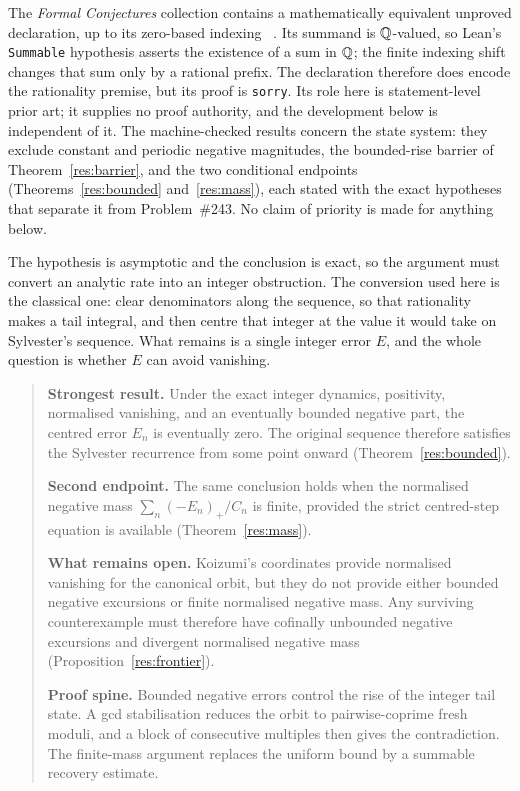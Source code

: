 \documentclass[11pt]{article}
\begin{document}
The \emph{Formal Conjectures} collection contains a mathematically equivalent
unproved declaration, up to its zero-based indexing
~\cite{formalconjectures243}.  Its summand is $\mathbb{Q}$-valued, so Lean's
\texttt{Summable} hypothesis asserts the existence of a sum in $\mathbb{Q}$; the
finite indexing shift changes that sum only by a rational prefix.  The
declaration therefore does encode the rationality premise, but its proof is
\texttt{sorry}.  Its role here is statement-level prior art; it supplies no
proof authority, and the development below is independent of it.
The machine-checked results concern the state system: they exclude constant and
periodic negative magnitudes, the bounded-rise barrier of
Theorem~\ref{res:barrier}, and the two conditional endpoints
(Theorems~\ref{res:bounded} and~\ref{res:mass}), each stated with the exact
hypotheses that separate it from Problem~\#243.  No claim of priority is made
for anything below.

The hypothesis is asymptotic and the conclusion is exact, so the argument must
convert an analytic rate into an integer obstruction.  The conversion used here
is the classical one: clear denominators along the sequence, so that
rationality makes a tail integral, and then centre that integer at the value it
would take on Sylvester's sequence.  What remains is a single integer error
$E$, and the whole question is whether $E$ can avoid vanishing.

\statusboundary

\begin{quote}\small
\textbf{Strongest result.}
Under the exact integer dynamics, positivity, normalised vanishing, and an
eventually bounded negative part, the centred error $E_n$ is eventually zero.
The original sequence therefore satisfies the Sylvester recurrence from some
point onward (Theorem~\ref{res:bounded}).

\smallskip
\textbf{Second endpoint.}
The same conclusion holds when the normalised negative mass
$\sum_n(-E_n)_+/C_n$ is finite, provided the strict centred-step equation is
available (Theorem~\ref{res:mass}).

\smallskip
\textbf{What remains open.}
Koizumi's coordinates provide normalised vanishing for the canonical orbit,
but they do not provide either bounded negative excursions or finite
normalised negative mass.  Any surviving counterexample must therefore have
cofinally unbounded negative excursions and divergent normalised negative
mass (Proposition~\ref{res:frontier}).

\smallskip
\textbf{Proof spine.}
Bounded negative errors control the rise of the integer tail state.  A gcd
stabilisation reduces the orbit to pairwise-coprime fresh moduli, and a block
of consecutive multiples then gives the contradiction.  The finite-mass
argument replaces the uniform bound by a summable recovery estimate.
\end{quote}
\end{document}
